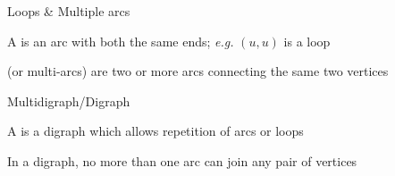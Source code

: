 \documentclass[aspectratio=169]{beamer}\usepackage[]{graphicx}\usepackage[]{xcolor}
\begin{document}
\begin{frame}{Loops \& Multiple arcs}
	\begin{definition}[{Loop}]
	A  is an arc with both the same ends; \emph{e.g.} $(u,u)$ is a loop
\end{definition}
\vfill
	\begin{definition}
	 (or multi-arcs) are two or more arcs connecting the same two vertices
	\end{definition}
\end{frame}
\begin{frame}{Multidigraph/Digraph}
	\begin{definition}[{Multidigraph}]
	A  is a digraph which allows repetition of arcs or loops
	\end{definition}
	\vfill
	\begin{definition}[{Digraph}]
	In a digraph, no more than one arc can join any pair of vertices
\end{definition}
\end{frame}
\end{document}

